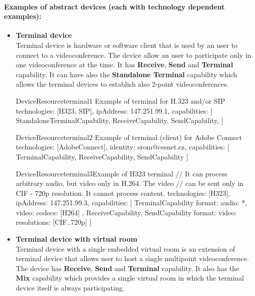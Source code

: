 \paragraph{Examples of abstract devices (each with technology dependent 
           examples):}

\begin{itemize}

\item \textbf{Terminal device} \\
  Terminal device is hardware or software client that is used by an user to 
  connect to a videoconference. The device allow an user to participate only 
  in one videoconference at the time. It has \textbf{Receive}, \textbf{Send} 
  and \textbf{Terminal} capability. It can have also the 
  \textbf{Standalone Terminal} capability which allows the terminal devices to  
  establish also 2-point videoconferences. 
  
\begin{EntityExample}{DeviceResource}{terminal1}%
      {Example of terminal for H.323 and/or SIP}
technologies: [H323, SIP],
ipAddress: 147.251.99.1,
capabilities: [
  StandaloneTerminalCapability,
  ReceiveCapability,
  SendCapability, 
]
\end{EntityExample}

\begin{EntityExample}{DeviceResource}{terminal2}%
      {Example of terminal (client) for Adobe Connect}
technologies: [AdobeConnect],
identity: srom@cesnet.cz,
capabilities: [
  TerminalCapability,
  ReceiveCapability,
  SendCapability
]
\end{EntityExample}

\begin{EntityExample}{DeviceResource}{terminal3}{Example of H323 terminal}
// It can process arbitrary audio, but video only in H.264. The video
// can be sent only in CIF - 720p resolution. It cannot process content.
technologies: [H323],
ipAddress: 147.251.99.3,
capabilities: [
  TerminalCapability {
    format: {
      audio: *,
      video: {codecs: [H264]}
    }
  },
  ReceiveCapability,
  SendCapability {
    format: {
      video: {resolutions: [CIF..720p]}
    }
  }
]
\end{EntityExample}

\item \textbf{Terminal device with virtual room} \\
  Terminal device with a single embedded virtual room is an extension of 
  terminal device that allows user to host a single multipoint 
  videoconference. The  device has \textbf{Receive}, \textbf{Send} and
  \textbf{Terminal} capability. It also has the \textbf{Mix} capability
  which provides a single virtual room in which the terminal device itself is 
  always participating.
  

\end{itemize}
